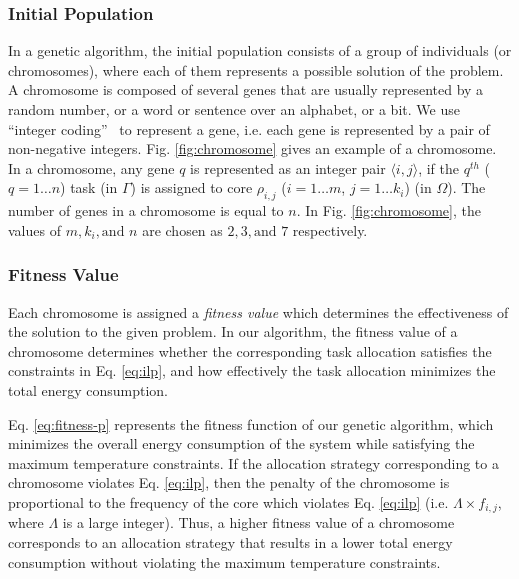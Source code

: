 \documentclass[conference]{IEEEtran}
\begin{document}
\subsubsection{Initial Population} In a genetic algorithm, the initial population consists of a group of individuals (or chromosomes),
where each of them
represents a possible solution of the problem. 
A chromosome is composed of several genes that are usually
represented by a random number, or a word or sentence over an
alphabet, or a bit. We use ``integer coding''~\cite{Goldberg} to represent a gene,
i.e. each gene is represented by a pair of non-negative integers. Fig. \ref{fig:chromosome} gives an example of a chromosome. %
In a chromosome, any gene $q$ is represented as an integer pair $\langle i,j\rangle$, if  the $q^{th}$ ($q=1\ldots n$) task (in $\Gamma$) is 
assigned to core $\rho_{i,j}$ ($i=1\ldots m$, $j=1\ldots k_i$) (in $\Omega$). The number of genes in a chromosome is equal to $n$.
In  Fig. \ref{fig:chromosome}, the values of $m, k_i, \text{and } n$ are chosen as $2, 3, \text{and } 7$ respectively. 


\subsubsection{Fitness Value} Each chromosome is assigned a \emph{fitness value} which determines the effectiveness of the solution
to the given problem. In our algorithm, the fitness value of a chromosome determines whether the corresponding task allocation 
satisfies the constraints  in Eq. \ref{eq:ilp}, and how effectively 
the task allocation minimizes the
total energy consumption.

Eq. \ref{eq:fitness-p} represents the fitness function of our genetic algorithm, which minimizes the 
overall energy consumption of the system while satisfying the maximum temperature constraints. 
If the allocation strategy corresponding to a chromosome violates Eq. \ref{eq:ilp}, then the penalty of the chromosome is
proportional to the frequency of the core 
which violates  Eq. \ref{eq:ilp} (i.e. $\Lambda \times f_{i,j}$, where
$\Lambda$ is a large integer).
Thus, a higher fitness value of a chromosome corresponds to an allocation strategy that results in
a lower total energy consumption without violating the maximum temperature constraints. 


\end{document}
